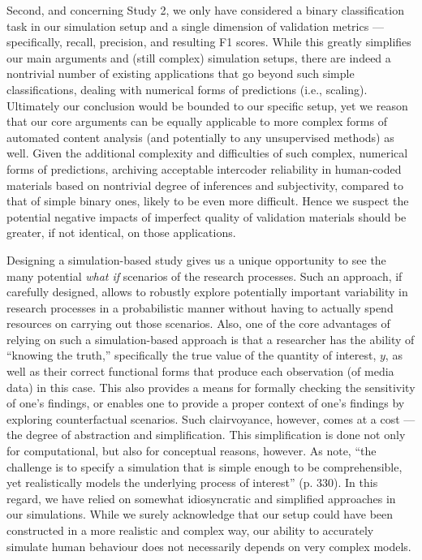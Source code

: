 \documentclass[man, 12pt, a4paper, nolmodern, noextraspace]{apa6}
\begin{document}
    Second, and concerning Study 2, we only have considered a binary classification task in our simulation setup and a single dimension of validation metrics --- specifically, recall, precision, and resulting F1 scores. While this greatly simplifies our main arguments and (still complex) simulation setups, there are indeed a nontrivial number of existing applications that go beyond such simple classifications, dealing with numerical forms of predictions (i.e., scaling). Ultimately our conclusion would be bounded to our specific setup, yet we reason that our core arguments can be equally applicable to more complex forms of automated content analysis (and potentially to any unsupervised methods) as well. Given the additional complexity and difficulties of such complex, numerical forms of predictions, archiving acceptable intercoder reliability in human-coded materials based on nontrivial degree of inferences and subjectivity, compared to that of simple binary ones, likely to be even more difficult. Hence we suspect the potential negative impacts of imperfect quality of validation materials should be greater, if not identical, on those applications. 

    Designing a simulation-based study gives us a unique opportunity to see the many potential \textit{what if} scenarios of the research processes. Such an approach, if carefully designed, allows to robustly explore potentially important variability in research processes in a probabilistic manner without having to actually spend resources on carrying out those scenarios. Also, one of the core advantages of relying on such a simulation-based approach is that a researcher has the ability of \enquote{knowing the truth,} specifically the true value of the quantity of interest, $y$, as well as their correct functional forms that produce each observation (of media data) in this case. This also provides a means for formally checking the sensitivity of one’s findings, or enables one to provide a proper context of one's findings by exploring counterfactual scenarios. Such clairvoyance, however, comes at a cost --- the degree of abstraction and simplification. This simplification is done not only for computational, but also for conceptual reasons, however. As \textcite{scharkow2017measurement} note, \enquote{the challenge is to specify a simulation that is simple enough to be comprehensible, yet realistically models the underlying process of interest} (p. 330). In this regard, we have relied on somewhat idiosyncratic and simplified approaches in our simulations. While we surely acknowledge that our setup could have been constructed in a more realistic and complex way, our ability to accurately simulate human behaviour does not necessarily depends on very complex models. 
\end{document}
